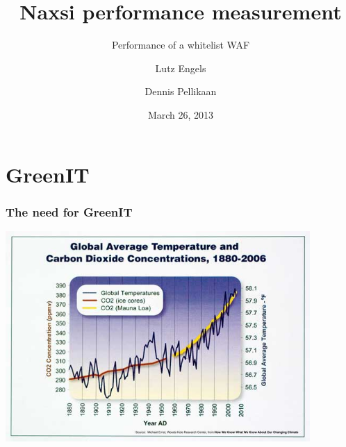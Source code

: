 \documentclass[11pt]{beamer}
\title{Naxsi performance measurement}
\subtitle{Performance of a whitelist WAF}
\author{Lutz Engels \and Dennis Pellikaan}
\institute[University of Amsterdam] %
{
{\large University of Amsterdam} \\
System and Network Engineering
}
\date{March 26, 2013}
\begin{document}
\begin{frame}
  \titlepage
\end{frame}
\section{GreenIT}

\begin{frame}
  \frametitle{The need for GreenIT}
  \begin{center} 
   \includegraphics[width=0.87\textwidth]{images/co2temp.jpg} 
  \end{center} 
\end{frame}
\end{document}
